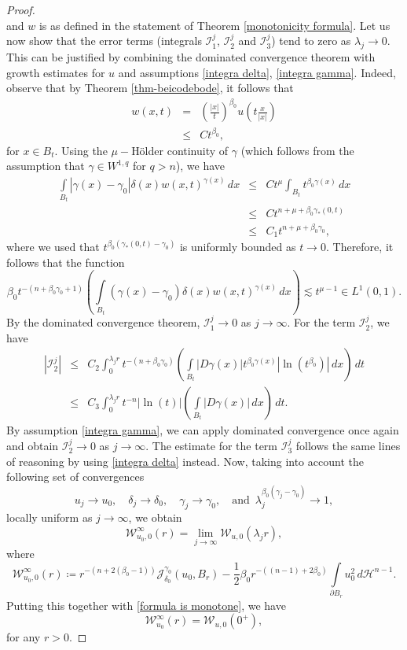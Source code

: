 \documentclass[reqno,11pt]{amsart}
\newcommand{\1}{\mathds{1}}
\numberwithin{equation}{section}
\begin{document}
\begin{proof}
$$$$
and $w$ is as defined in the statement of Theorem \ref{monotonicity formula}. Let us now show that the error terms (integrals $\mathcal{I}^j_1$, $\mathcal{I}^j_2$ and $\mathcal{I}^j_3$) tend to zero as $\lambda_j \to 0$. This can be justified by combining the dominated convergence theorem with growth estimates for $u$ and assumptions \eqref{integra delta}, \eqref{integra gamma}. Indeed, observe that by Theorem \ref{thm-beicodebode}, it follows that
\begin{eqnarray*}
    w(x,t)  & = & \left(\frac{|x|}{t}\right)^{\beta_0}u\left(t\frac{x}{|x|}\right)\\
            & \leq & Ct^{\beta_0},
\end{eqnarray*}
for $x \in B_t$. Using the $\mu-$H\"older continuity of $\gamma$ (which follows from the assumption that $\gamma \in W^{1,q}$ for $q>n$), we have
\begin{eqnarray*}
    \int\limits_{B_t}|\gamma(x)-\gamma_0|\delta(x)w(x,t)^{\gamma(x)} \, dx & \leq & Ct^{\mu} \int_{B_t} t^{\beta_0 \gamma(x)}\, dx\\
    & \leq & C t^{n + \mu + \beta_0 \gamma_\ast(0,t)}\\
    & \leq & C_1 t^{n + \mu + \beta_0 \gamma_0},
\end{eqnarray*}
where we used that $t^{\beta_0(\gamma_\ast(0,t)-\gamma_0)}$ is uniformly bounded as $t \to 0$. Therefore, it follows that the function
$$
    \beta_0 t^{-(n+\beta_0 \gamma_0 +1)}\left(\int\limits_{B_t}(\gamma(x)-\gamma_0)\delta(x)w(x,t)^{\gamma(x)} \, dx\right) \lesssim t^{\mu -1} \in L^1(0,1).
$$
By the dominated convergence theorem, $\mathcal{I}_1^j \to 0$ as $j \to \infty$. For the term $\mathcal{I}^j_2$, we have
\begin{eqnarray*}
	\left|\mathcal{I}^j_2 \right| & \leq & C_2 \int_{0}^{\lambda_j r}t^{-(n+\beta_0 \gamma_0)}\left(\int\limits_{B_t}|D\gamma(x)| t^{\beta_0 \gamma(x)}  |\ln(t^{\beta_0})| \, dx\right)\, dt\\
	& \leq & C_3 \int_{0}^{\lambda_j r}t^{-n}|\ln(t)|\left(\int\limits_{B_t}|D\gamma(x)| \, dx\right)\, dt.
\end{eqnarray*}
By assumption \eqref{integra gamma}, we can apply dominated convergence once again and obtain $\mathcal{I}_2^j \to 0$ as $j \to \infty$. The estimate for the term $\mathcal{I}^j_3$ follows the same lines of reasoning by using \eqref{integra delta} instead. Now, taking into account the following set of convergences
$$
	u_j \to u_0, \quad \delta_j \to \delta_0, \quad \gamma_j \to \gamma_0, \quad \text{and }\, \lambda_j^{\beta_0(\gamma_j - \gamma_0)} \to 1,
$$
locally uniform as $j \to \infty$, we obtain
$$
	\mathcal{W}^\infty_{u_0,0}(r) = \lim_{j \to \infty} \mathcal{W}_{u,0}(\lambda_j r),
$$
where
$$
	\mathcal{W}^\infty_{u_0,0}(r) \coloneqq r^{-(n+2(\beta_0-1))}\mathcal{J}_{\delta_0}^{\gamma_0}(u_0,B_r)-\frac{1}{2}\beta_0 r^{-((n-1) + 2\beta_0)}\int\limits_{\partial B_r}u_0^2\, d\mathcal{H}^{n-1}.
$$
Putting this together with \eqref{formula is monotone}, we have
$$
	\mathcal{W}^\infty_{u_0}(r) = \mathcal{W}_{u,0}(0^+),	
$$
for any $r>0$.


\end{proof}
\end{document}

